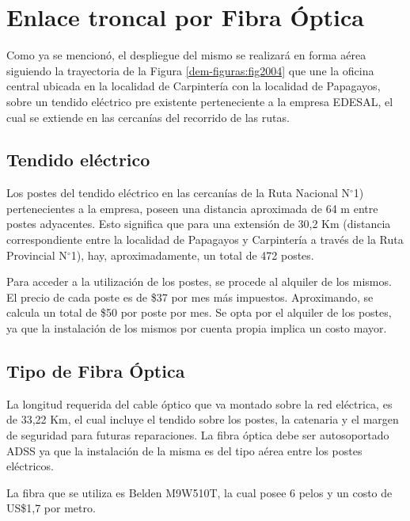 \section{Enlace troncal por Fibra Óptica}

Como ya se mencionó, el despliegue del mismo se realizará en forma aérea siguiendo la  trayectoria de la Figura \ref{dem-figuras:fig2004} que une la oficina central ubicada en la localidad de Carpintería con la localidad de Papagayos, sobre un tendido eléctrico pre existente perteneciente a la empresa EDESAL, el cual se extiende en las cercanías  del recorrido de las rutas.

\subsection{Tendido eléctrico}

Los postes del tendido eléctrico en las cercanías de la Ruta Nacional N{$^{\circ}$}1) pertenecientes a la empresa, poseen una distancia aproximada de 64 m entre postes adyacentes. Esto significa que para una extensión de 30,2 Km (distancia correspondiente entre la localidad de Papagayos y Carpintería a través de la Ruta Provincial N{$^{\circ}$}1), hay, aproximadamente, un total de 472 postes.


Para acceder a la utilización de los postes, se procede al alquiler de los mismos. El precio de cada poste es de \$37 por mes más impuestos. Aproximando, se calcula un total de \$50 por poste por mes. Se opta por el alquiler de los postes, ya que la instalación de los mismos por cuenta propia implica un costo mayor.

\subsection{Tipo de Fibra Óptica}

La longitud requerida del cable óptico que va montado sobre la red eléctrica, es de 33,22 Km, el cual incluye el tendido sobre los postes, la catenaria y el margen de seguridad para futuras reparaciones. La fibra óptica debe ser autosoportado ADSS ya que la instalación de la misma es del tipo aérea entre los postes eléctricos.

La fibra que se utiliza es Belden M9W510T, la cual posee 6 pelos y un costo de US\$1,7 por metro.


